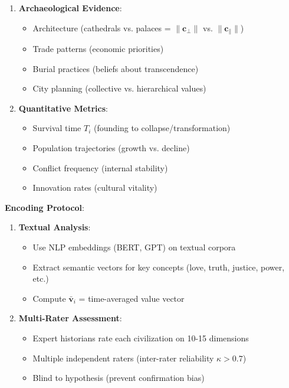 \documentclass[11pt,a4paper]{article}
\theoremstyle{definition}
\theoremstyle{remark}
\newcommand{\cc}{\mathbf{c}}
\begin{document}
\begin{enumerate}
\begin{protocol}
\begin{enumerate}
    \item \textbf{Archaeological Evidence}:
        \begin{itemize}[nosep]
            \item Architecture (cathedrals vs. palaces = \(\|\cc_\perp\|\) vs. \(\|\cc_\parallel\|\))
            \item Trade patterns (economic priorities)
            \item Burial practices (beliefs about transcendence)
            \item City planning (collective vs. hierarchical values)
        \end{itemize}
    
    \item \textbf{Quantitative Metrics}:
        \begin{itemize}[nosep]
            \item Survival time \(T_i\) (founding to collapse/transformation)
            \item Population trajectories (growth vs. decline)
            \item Conflict frequency (internal stability)
            \item Innovation rates (cultural vitality)
        \end{itemize}
\end{enumerate}

\textbf{Encoding Protocol}:
\begin{enumerate}
    \item \textbf{Textual Analysis}:
        \begin{itemize}
            \item Use NLP embeddings (BERT, GPT) on textual corpora
            \item Extract semantic vectors for key concepts (love, truth, justice, power, etc.)
            \item Compute \(\bar{\mathbf{v}}_i\) = time-averaged value vector
        \end{itemize}
    
    \item \textbf{Multi-Rater Assessment}:
        \begin{itemize}
            \item Expert historians rate each civilization on 10-15 dimensions
            \item Multiple independent raters (inter-rater reliability \(\kappa > 0.7\))
            \item Blind to hypothesis (prevent confirmation bias)
        \end{itemize}
    

\end{enumerate}
\end{protocol}
\end{enumerate}
\end{document}
